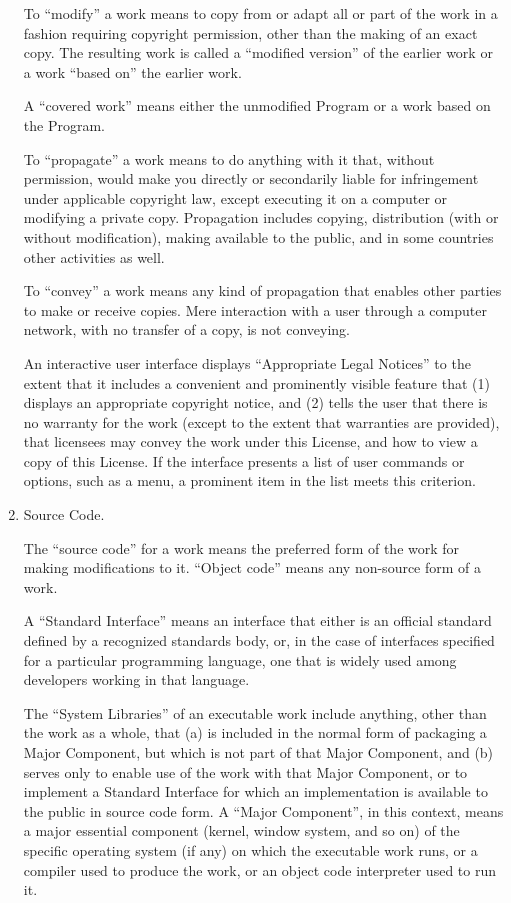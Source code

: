 \documentclass[11pt,a4paper]{refrep}
\begin{document}
\begin{fullpage}
\begin{enumerate}
To ``modify'' a work means to copy from or adapt all or part of the work
in a fashion requiring copyright permission, other than the making of an
exact copy.  The resulting work is called a ``modified version'' of the
earlier work or a work ``based on'' the earlier work.

A ``covered work'' means either the unmodified Program or a work based
on the Program.

To ``propagate'' a work means to do anything with it that, without
permission, would make you directly or secondarily liable for
infringement under applicable copyright law, except executing it on a
computer or modifying a private copy.  Propagation includes copying,
distribution (with or without modification), making available to the
public, and in some countries other activities as well.

To ``convey'' a work means any kind of propagation that enables other
parties to make or receive copies.  Mere interaction with a user through
a computer network, with no transfer of a copy, is not conveying.

An interactive user interface displays ``Appropriate Legal Notices''
to the extent that it includes a convenient and prominently visible
feature that (1) displays an appropriate copyright notice, and (2)
tells the user that there is no warranty for the work (except to the
extent that warranties are provided), that licensees may convey the
work under this License, and how to view a copy of this License.  If
the interface presents a list of user commands or options, such as a
menu, a prominent item in the list meets this criterion.

\item Source Code.

The ``source code'' for a work means the preferred form of the work
for making modifications to it.  ``Object code'' means any non-source
form of a work.

A ``Standard Interface'' means an interface that either is an official
standard defined by a recognized standards body, or, in the case of
interfaces specified for a particular programming language, one that
is widely used among developers working in that language.

The ``System Libraries'' of an executable work include anything, other
than the work as a whole, that (a) is included in the normal form of
packaging a Major Component, but which is not part of that Major
Component, and (b) serves only to enable use of the work with that
Major Component, or to implement a Standard Interface for which an
implementation is available to the public in source code form.  A
``Major Component'', in this context, means a major essential component
(kernel, window system, and so on) of the specific operating system
(if any) on which the executable work runs, or a compiler used to
produce the work, or an object code interpreter used to run it.


\end{enumerate}
\end{fullpage}
\end{document}
